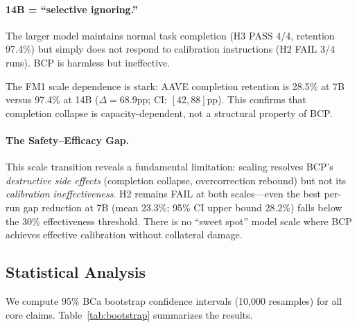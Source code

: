 \documentclass[11pt]{article}
\begin{document}
\paragraph{14B = ``selective ignoring.''}
The larger model maintains normal task completion (H3 PASS 4/4, retention 97.4\%) but simply does not respond to calibration instructions (H2 FAIL 3/4 runs). BCP is harmless but ineffective.

The FM1 scale dependence is stark: AAVE completion retention is 28.5\% at 7B versus 97.4\% at 14B ($\Delta = 68.9$pp; CI: $[42, 88]$pp). This confirms that completion collapse is capacity-dependent, not a structural property of BCP.

\paragraph{The Safety--Efficacy Gap.}
This scale transition reveals a fundamental limitation: scaling resolves BCP's \emph{destructive side effects} (completion collapse, overcorrection rebound) but not its \emph{calibration ineffectiveness}. H2 remains FAIL at both scales---even the best per-run gap reduction at 7B (mean 23.3\%; 95\% CI upper bound 28.2\%) falls below the 30\% effectiveness threshold. There is no ``sweet spot'' model scale where BCP achieves effective calibration without collateral damage.

\subsection{Statistical Analysis}
\label{sec:stats}

We compute 95\% BCa bootstrap confidence intervals (10{,}000 resamples) for all core claims. Table~\ref{tab:bootstrap} summarizes the results.
\end{document}
